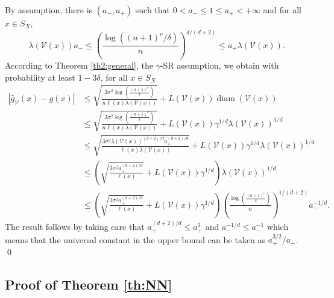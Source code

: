 \documentclass[paper=a4, fontsize=11pt]{scrartcl}
\newcommand{\diam}{\operatorname{diam}}
\begin{document}
By assumption, there is $(a_-,a_+) $ such that $ 0< a _- \leq 1\leq   a _+ < +\infty $ and for all $x \in S_X$,
$$ \lambda(\mathcal V(x))  a_-  \leq \left( \frac{\log \left({(n+1)^v}/{\delta} \right)}{n} \right)^{d/(d+2)}\leq a_ + \lambda(\mathcal V(x)).$$
According to Theorem \ref{th2:general}, the $\gamma$-SR assumption, we obtain with probability at least $1 - 3\delta $, for all $x\in S_X$
\begin{align*}
        | \hat g_{\mathcal V}(x) - g(x)| &\leq  \sqrt{\frac{ 3 \sigma^2 \log\left( \frac{(n+1)^v}{\delta} \right) }{n  \ell(x) \lambda ( \mathcal V (x) )   }} + L(\mathcal V(x) ) \diam (\mathcal V(x) ) \\ 
        &\leq  \sqrt{\frac{ 3 \sigma^2 \log\left( \frac{(n+1)^v}{\delta} \right) }{n  \ell(x) \lambda ( \mathcal V (x) )   }} + L(\mathcal V(x) )\gamma^{1/d}  \lambda ( \mathcal V (x) )^{1/d} \\ &\leq  \sqrt{\frac{ 3 \sigma^2   \lambda ( \mathcal V (x) )  ^{(d+2)/d}a_+ ^{(d+2)/d}}{ \ell(x) \lambda ( \mathcal V (x) )   }} + L(\mathcal V(x) )\gamma^{1/d}  \lambda ( \mathcal V (x) )^{1/d} \\ &\leq  \left(  \sqrt{\frac{ 3 \sigma^2 a_+ ^{(d+2)/d} }{ \ell(x)}} + L(\mathcal V(x) )\gamma^{1/d} \right)  \lambda ( \mathcal V (x) )^{1/d} \\ &\leq \left( \sqrt{\frac{ 3 \sigma^2 a_+ ^{(d+2)/d}}{ \ell(x)}} + L(\mathcal V(x) )\gamma^{1/d} \right) 
 \left(\frac{\log\left( \frac{(n+1)^v}{ \delta} \right) }{ n} \right) ^{1/(d+2)} a_- ^{-1/d}.
\end{align*}
The result follows by taking care that $a_+ ^{(d+2)/d} \leq a_+^3 $  and $ a_- ^{-1/d}\leq a_-^{-1} $ which means that the universal constant in the upper bound can be taken as $ a_+^{3/2} / a_- $. \qed

\subsection*{Proof of Theorem \ref{th:NN}}
\end{document}
